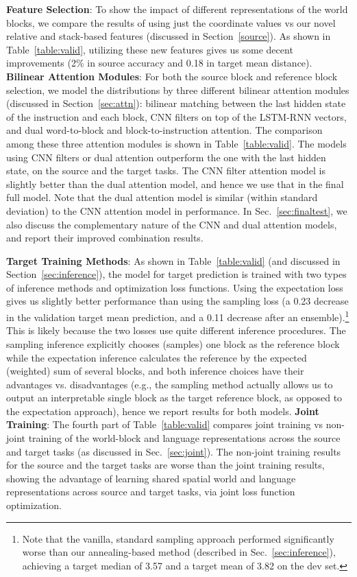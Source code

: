 \documentclass[letterpaper]{article} %
\begin{document}
\textbf{Feature Selection}:
To show the impact of different representations of the world blocks, we compare the results of using just the coordinate values vs our novel relative and stack-based features (discussed in Section~\ref{source}).
As shown in Table~\ref{table:valid}, utilizing these new features gives us some decent improvements (2\% in source accuracy and 0.18 in target mean distance).  \textbf{Bilinear Attention Modules}:
For both the source block and reference block selection, we model the distributions by three different bilinear attention modules (discussed in Section~\ref{sec:attn}): bilinear matching between the last hidden state of the instruction and each block, CNN filters on top of the LSTM-RNN vectors, and dual word-to-block and block-to-instruction attention. The comparison among these three attention modules is shown in Table~\ref{table:valid}.
The models using CNN filters or dual attention outperform the one with the last hidden state, on the source and the target tasks. The CNN filter attention model is slightly better than the dual attention model, and hence we use that in the final full model. Note that the dual attention model is similar (within standard deviation) to the CNN attention model in performance. In Sec.~\ref{sec:finaltest}, we also discuss the complementary nature of the CNN and dual attention models, and report their improved combination results.




\textbf{Target Training Methods}:
As shown in Table~\ref{table:valid} (and discussed in Section~\ref{sec:inference}), the model for target prediction is trained with two types of inference methods and optimization loss functions. Using the expectation loss gives us slightly better performance than using the sampling loss (a 0.23 decrease in the validation target mean prediction, and a 0.11 decrease after an ensemble).\footnote{Note that the vanilla, standard sampling approach performed significantly worse than our annealing-based method (described in Sec.~\ref{sec:inference}), achieving a target median of 3.57 and a target mean of 3.82 on the dev set.}
This is likely because the two losses use quite different inference procedures. The sampling inference explicitly chooses (samples) one block as the reference block while the expectation inference calculates the reference by the expected (weighted) sum of several blocks, and both inference choices have their advantages vs. disadvantages (e.g., the sampling method actually allows us to output an interpretable single block as the target reference block, as opposed to the expectation approach), hence we report results for both models.  \textbf{Joint Training}:
The fourth part of Table~\ref{table:valid} compares  joint training vs non-joint training of the world-block and language representations across the source and target tasks (as discussed in Sec.~\ref{sec:joint}). The non-joint training results for the source and the target tasks are worse than the joint training results, showing the advantage of learning shared spatial world and language representations across source and target tasks, via joint loss function optimization.
\end{document}
